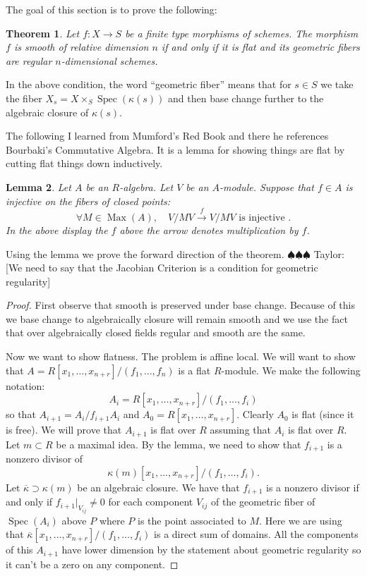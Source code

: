\documentclass[12pt]{article}
\numberwithin{equation}{section}
\newtheorem{theorem}{Theorem}[subsection]
\newtheorem{lemma}[theorem]{Lemma}
\theoremstyle{definition}
\theoremstyle{remark}
\newcommand{\Spec}{\operatorname{Spec}}
\newcommand{\Max}{\operatorname{Max}}
\newcommand{\taylor}[1]{{\color{blue} \sf $\spadesuit\spadesuit\spadesuit$ Taylor: [#1]}}
\begin{document}
The goal of this section is to prove the following:
\begin{theorem}
	Let $f:X\to S$ be a finite type morphisms of schemes. 
	The morphism $f$ is smooth of relative dimension $n$ if and only if it is flat and its geometric fibers are regular $n$-dimensional schemes.
\end{theorem}

In the above condition, the word ``geometric fiber'' means that for $s\in S$ we take the fiber $X_s = X\times_S \Spec(\kappa(s))$ and then base change further to the algebraic closure of $\kappa(s)$.

The following I learned from Mumford's Red Book and there he references Bourbaki's Commutative Algebra.
It is a lemma for showing things are flat by cutting flat things down inductively. 
\begin{lemma}
	Let $A$ be an $R$-algebra. 
	Let $V$ be an $A$-module.
	Suppose that $f\in A$ is injective on the fibers of closed points: 
	$$\forall{M\in \Max(A)}, \quad V/MV\xrightarrow{f}V/MV \mbox{ is injective }.$$ In the above display the $f$ above the arrow denotes multiplication by $f$.
\end{lemma}

Using the lemma we prove the forward direction of the theorem. \taylor{We need to say that the Jacobian Criterion is a condition for geometric regularity} 
\begin{proof}
	First observe that smooth is preserved under base change. 
	Because of this we base change to algebraically closure will remain smooth and we use the fact that over algebraically closed fields regular and smooth are the same.
	
	Now we want to show flatness.
	The problem is affine local. 
	We will want to show that $A = R[x_1,\ldots,x_{n+r}]/(f_1,\ldots,f_n)$ is a flat $R$-module. 
	We make the following notation:
	$$ A_i = R[x_1,\ldots,x_{n+r}]/(f_1,\ldots,f_i) $$
	so that $A_{i+1}=A_i/f_{i+1}A_i$ and $A_0 = R[x_1,\ldots,x_{n+r}]$. 
	Clearly $A_0$ is flat (since it is free).
	We will prove that $A_{i+1}$ is flat over $R$ assuming that $A_i$ is flat over $R$.
	Let $m \subset R$ be a maximal idea. 
	By the lemma, we need to show that $f_{i+1}$ is a nonzero divisor of 
	$$\kappa(m)[x_1,\ldots,x_{n+r}]/(f_1,\ldots,f_i).$$ 
	Let $\overline{\kappa} \supset \kappa(m)$ be an algebraic closure. 
	We have that $f_{i+1}$ is a nonzero divisor if and only if $f_{i+1}\vert_{V_{ij}}\neq 0$ for each component $V_{ij}$ of the geometric fiber of $\Spec(A_i)$ above $P$ where $P$ is the point associated to $M$. 
	Here we are using that $\overline{\kappa}[x_1,\ldots,x_{n+r}]/(f_1,\ldots,f_i)$ is a direct sum of domains. 
	All the components of this $A_{i+1}$ have lower dimension by the statement about geometric regularity so it can't be a zero on any component.
\end{proof}
\end{document}
